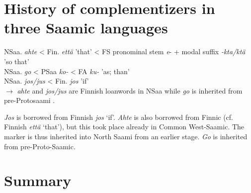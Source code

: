 \documentclass[a4,12pt]{scrartcl}
\begin{document}
\section{History of complementizers in three Saamic languages}\label{history}
NSaa. {\it ahte} < Fin. {\it että} 'that' < FS pronominal stem {\it *e}- + modal suffix {\it -kta/ktä} 'so that'\bigskip\\
NSaa. {\it go} < PSaa {\it *ko-} < FA {\it *ku-} 'as; than'\bigskip\\
NSaa. {\it jos/jus} < Fin. {\it jos} 'if'\bigskip\\
$\rightarrow$ {\it ahte} and {\it jos/jus} are Finnish loanwords in NSaa while {\it go} is inherited from pre-Protosaami \cite[226;245;251]{sammallahti1998b}.

 {\it Jos} is borrowed from Finnish {\it jos} ‘if’. {\it Ahte} is also borrowed from Finnic (cf. Finnish {\it että} ‘that’), but this took place already in Common West-Saamic. The marker is thus inherited into North Saami from an earlier stage. {\it Go} is inherited from pre-Proto-Saamic.
%


\section{Summary}\label{summary}

\printbibliography
\end{document}

